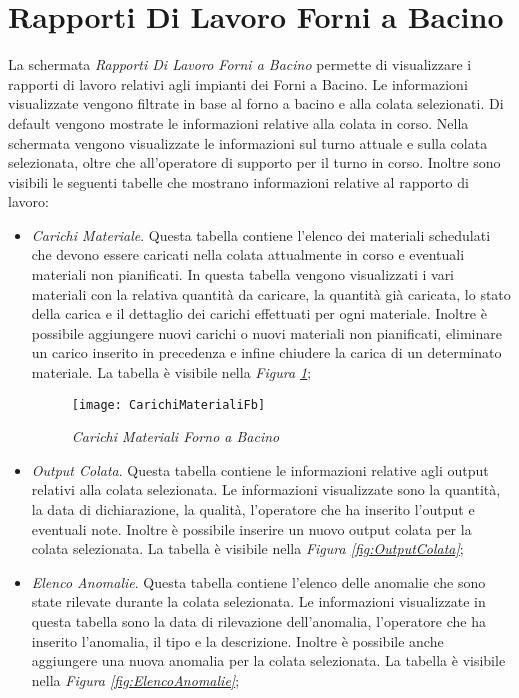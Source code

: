   \section{Rapporti Di Lavoro Forni a Bacino}
  La schermata \textit{Rapporti Di Lavoro Forni a Bacino} permette di visualizzare
  i rapporti di lavoro relativi agli impianti dei Forni a Bacino. Le informazioni visualizzate vengono filtrate in base al
  forno a bacino e alla colata selezionati. Di default vengono mostrate le informazioni relative alla colata in corso.
  Nella schermata vengono visualizzate le informazioni sul turno attuale e sulla colata selezionata, oltre che all'operatore
  di supporto per il turno in corso. Inoltre sono visibili le seguenti tabelle che mostrano informazioni relative al 
  rapporto di lavoro:
  \begin{itemize}
    \item \textit{Carichi Materiale}. Questa tabella contiene l'elenco dei materiali schedulati che devono essere caricati nella
    colata attualmente in corso e eventuali materiali non pianificati. In questa tabella vengono visualizzati i vari materiali
    con la relativa quantità da caricare, la quantità già caricata, lo stato della carica e il dettaglio dei carichi effettuati
    per ogni materiale. Inoltre è possibile aggiungere nuovi carichi o nuovi materiali non pianificati, eliminare un carico
    inserito in precedenza e infine chiudere la carica di un determinato materiale. La tabella è visibile nella
    \textit{Figura \ref{fig:CarichiMaterialiFb}};

    \begin{figure}[H]
      \texttt{[image: CarichiMaterialiFb]}
      \centering
      \caption{\textit{Carichi Materiali Forno a Bacino}}
      \label{fig:CarichiMaterialiFb}
    \end{figure}

    \item \textit{Output Colata}. Questa tabella contiene le informazioni relative agli output relativi alla colata selezionata.
    Le informazioni visualizzate sono la quantità, la data di dichiarazione, la qualità, l'operatore che ha inserito l'output
    e eventuali note. Inoltre è possibile inserire un nuovo output colata per la colata selezionata. La tabella è visibile 
    nella \textit{Figura \ref{fig:OutputColata}};

    \item \textit{Elenco Anomalie}. Questa tabella contiene l'elenco delle anomalie che sono state rilevate durante la colata
    selezionata. Le informazioni visualizzate in questa tabella sono la data di rilevazione dell'anomalia, l'operatore che
    ha inserito l'anomalia, il tipo e la descrizione. Inoltre è possibile anche aggiungere una nuova anomalia per la
    colata selezionata. La tabella è visibile nella \textit{Figura \ref{fig:ElencoAnomalie}};


\end{itemize}
